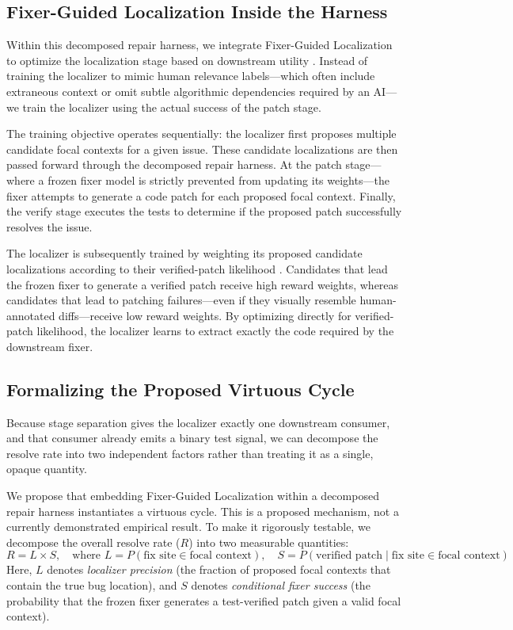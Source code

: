 \documentclass[11pt,a4paper]{article}
\begin{document}
\subsection{Fixer-Guided Localization Inside the Harness}
Within this decomposed repair harness, we integrate Fixer-Guided Localization to optimize the localization stage based on downstream utility \cite{FGL}. Instead of training the localizer to mimic human relevance labels---which often include extraneous context or omit subtle algorithmic dependencies required by an AI---we train the localizer using the actual success of the patch stage.

The training objective operates sequentially: the localizer first proposes multiple candidate focal contexts for a given issue. These candidate localizations are then passed forward through the decomposed repair harness. At the patch stage---where a frozen fixer model is strictly prevented from updating its weights---the fixer attempts to generate a code patch for each proposed focal context. Finally, the verify stage executes the tests to determine if the proposed patch successfully resolves the issue.

The localizer is subsequently trained by weighting its proposed candidate localizations according to their verified-patch likelihood \cite{FGL}. Candidates that lead the frozen fixer to generate a verified patch receive high reward weights, whereas candidates that lead to patching failures---even if they visually resemble human-annotated diffs---receive low reward weights. By optimizing directly for verified-patch likelihood, the localizer learns to extract exactly the code required by the downstream fixer.

\subsection{Formalizing the Proposed Virtuous Cycle}
Because stage separation gives the localizer exactly one downstream consumer, and that consumer already emits a binary test signal, we can decompose the resolve rate into two independent factors rather than treating it as a single, opaque quantity.

We propose that embedding Fixer-Guided Localization within a decomposed repair harness instantiates a virtuous cycle. This is a proposed mechanism, not a currently demonstrated empirical result. To make it rigorously testable, we decompose the overall resolve rate ($R$) into two measurable quantities:
\begin{equation}
    R = L \times S, \quad \text{where } L = P(\text{fix site} \in \text{focal context}), \quad S = P(\text{verified patch} \mid \text{fix site} \in \text{focal context})
\end{equation}
Here, $L$ denotes \emph{localizer precision} (the fraction of proposed focal contexts that contain the true bug location), and $S$ denotes \emph{conditional fixer success} (the probability that the frozen fixer generates a test-verified patch given a valid focal context).
\end{document}
